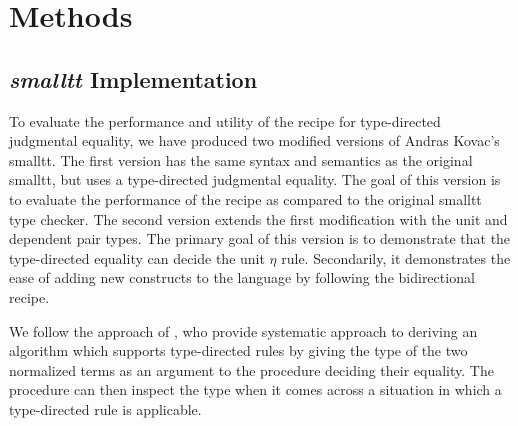 \section{Methods}

\subsection{\textit{smalltt} Implementation}

% 

To evaluate the performance and utility of the recipe for type-directed judgmental equality, we have produced two modified versions of Andras Kovac's smalltt.
The first version has the same syntax and semantics as the original smalltt, but uses a type-directed judgmental equality.
The goal of this version is to evaluate the performance of the recipe as compared to the original smalltt type checker.
The second version extends the first modification with the unit and dependent pair types.
The primary goal of this version is to demonstrate that the type-directed equality can decide the unit $\eta$ rule.
Secondarily, it demonstrates the ease of adding new constructs to the language by following the bidirectional recipe.

We follow the approach of \citet{Chapman2005}, who provide systematic approach to deriving an algorithm which supports type-directed rules by giving the type of the two normalized terms as an argument to the procedure deciding their equality.
The procedure can then inspect the type when it comes across a situation in which a type-directed rule is applicable.


